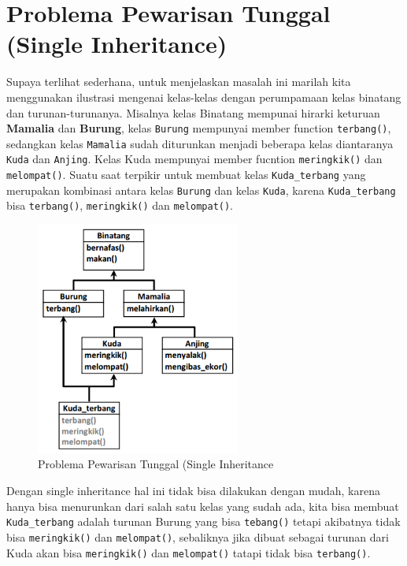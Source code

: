 \section{Problema Pewarisan Tunggal (Single Inheritance)}\label{problema-pewarisan-tunggal-single-inheritance}

Supaya terlihat sederhana, untuk menjelaskan masalah ini marilah kita
menggunakan ilustrasi mengenai kelas-kelas dengan perumpamaan kelas
binatang dan turunan-turunanya. Misalnya kelas Binatang mempunai hirarki
keturuan \textbf{Mamalia} dan \textbf{Burung}, kelas \texttt{Burung}
mempunyai member function \texttt{terbang()}, sedangkan kelas
\texttt{Mamalia} sudah diturunkan menjadi beberapa kelas diantaranya
\texttt{Kuda} dan \texttt{Anjing}. Kelas Kuda mempunyai member fucntion
\texttt{meringkik()} dan \texttt{melompat()}. Suatu saat terpikir untuk
membuat kelas \texttt{Kuda\_terbang} yang merupakan kombinasi antara
kelas \texttt{Burung} dan kelas \texttt{Kuda}, karena
\texttt{Kuda\_terbang} bisa \texttt{terbang()}, \texttt{meringkik()} dan
\texttt{melompat()}.

\begin{figure}[htbp]
\centering
\includegraphics[width=0.6\textwidth]{../manuscript/images/capture8-1}
\caption{Problema Pewarisan Tunggal (Single Inheritance}
\end{figure}

Dengan single inheritance hal ini tidak bisa dilakukan dengan mudah,
karena hanya bisa menurunkan dari salah satu kelas yang sudah ada, kita
bisa membuat \texttt{Kuda\_terbang} adalah turunan Burung yang bisa
\texttt{tebang()} tetapi akibatnya tidak bisa \texttt{meringkik()} dan
\texttt{melompat()}, sebaliknya jika dibuat sebagai turunan dari Kuda
akan bisa \texttt{meringkik()} dan \texttt{melompat()} tatapi tidak bisa
\texttt{terbang()}.

